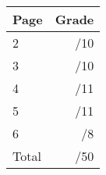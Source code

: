 \documentclass[12pt]{article}
\newcommand{\skipline}{\vspace{12pt}}
\begin{document}
\begin{table}[hbt]
\begin{center}
\begin{tabular}{|l|r|} \hline
Page&Grade\\
\hline \hline
\cline{1-2} 2 & \enspace\enspace\enspace\enspace\enspace\enspace/10\\
\cline{1-2} 3 & \enspace\enspace\enspace\enspace\enspace\enspace/10\\
\cline{1-2} 4 & \enspace\enspace\enspace\enspace\enspace\enspace/11\\
\cline{1-2} 5 & \enspace\enspace\enspace\enspace\enspace\enspace/11\\
\cline{1-2} 6 & \enspace\enspace\enspace\enspace\enspace\enspace/8\\
\cline{1-2} Total & \enspace\enspace\enspace\enspace\enspace\enspace/50\\
\hline
\end{tabular}

\skipline

\skipline

\skipline


\end{center}
\end{table}
\newpage
\end{document}
